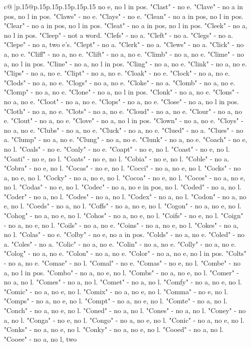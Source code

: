 \documentclass{article}
\begin{document}
{\begin{supertabular}{c@{$\;$}|p{.15\linewidth}@{}p{.15\linewidth}p{.15\linewidth}p{.15\linewidth}p{.15\linewidth}p{.15\linewidth}}
{{{no e, no l in pos. "Clast" {-} no e. "Clave" {-} no a in pos, no l in pos. "Claws" {-} no e. "Clays" {-} no e. "Clean" {-} no a in pos, no l in pos. "Clear" {-} no a in pos, no l in pos. "Cleat" {-} no a in pos, no l in pos. "Cleek" {-} no a, no l in pos. "Cleep" {-} not a word. "Clefs" {-} no a. "Cleft" {-} no a. "Clegs" {-} no a. "Clepe" {-} no a, two e's. "Clept" {-} no a. "Clerk" {-} no a. "Clews" {-} no a. "Click" {-} no a, no e. "Cliff" {-} no a, no e. "Clift" {-} no a, no e. "Climb" {-} no a, no e. "Clime" {-} no a, no l in pos. "Cline" {-} no a, no l in pos. "Cling" {-} no a, no e. "Clink" {-} no a, no e. "Clips" {-} no a, no e. "Clipt" {-} no a, no e. "Cloak" {-} no e. "Clock" {-} no a, no e. "Clods" {-} no a, no e. "Clogs" {-} no a, no e. "Cloke" {-} no a. "Clomb" {-} no a, no e. "Clomp" {-} no a, no e. "Clone" {-} no a, no l in pos. "Clonk" {-} no a, no e. "Clons" {-} no a, no e. "Cloot" {-} no a, no e. "Clops" {-} no a, no e. "Close" {-} no a, no l in pos. "Cloth" {-} no a, no e. "Clots" {-} no a, no e. "Cloud" {-} no a, no e. "Clour" {-} no a, no e. "Clout" {-} no a, no e. "Clove" {-} no a, no l in pos. "Clown" {-} no a, no e. "Cloys" {-} no a, no e. "Clubs" {-} no a, no e. "Cluck" {-} no a, no e. "Clued" {-} no a. "Clues" {-} no a. "Clump" {-} no a, no e. "Clung" {-} no a, no e. "Clunk" {-} no a, no e. "Coach" {-} no e, no l. "Coals" {-} no e. "Coaly" {-} no e. "Coapt" {-} no e, no l. "Coast" {-} no e, no l. "Coati" {-} no e, no l. "Coats" {-} no e, no l. "Cobia" {-} no e, no l. "Coble" {-} no a. "Cobra" {-} no e, no l. "Cocas" {-} no e, no l. "Cocci" {-} no a, no e, no l. "Cocks" {-} no a, no e, no l. "Cocky" {-} no a, no e, no l. "Cocoa" {-} no e, no l. "Cocos" {-} no a, no e, no l. "Codas" {-} no e, no l. "Codec" {-} no a, no e in pos, no l. "Coded" {-} no a, no l. "Coder" {-} no a, no l. "Codes" {-} no a, no l. "Codex" {-} no a, no l. "Codon" {-} no a, no e, no l. "Coeds" {-} no a, no l. "Coffs" {-} no a, no e, no l. "Cogon" {-} no a, no e, no l. "Cohog" {-} no a, no e, no l. "Cohos" {-} no a, no e, no l. "Coifs" {-} no e, no l. "Coign" {-} no a, no e, no l. "Coils" {-} no a, no e. "Coins" {-} no a, no e, no l. "Cokes" {-} no a, no l. "Colas" {-} no e. "Colby" {-} no e, no a in pos. "Colds" {-} no a, no e. "Coled" {-} no a. "Coles" {-} no a. "Colic" {-} no a, no e. "Colin" {-} no a, no e. "Colly" {-} no a, no e. "Colog" {-} no a, no e. "Colon" {-} no a, no e. "Color" {-} no a, no e, no l in pos. "Colts" {-} no a, no e. "Comae" {-} no l. "Comal" {-} no e. "Comas" {-} no e, no l. "Combe" {-} no a, no l in pos. "Combo" {-} no a, no e, no l. "Combs" {-} no a, no e, no l. "Comer" {-} no a, no l. "Comes" {-} no a, no l. "Comet" {-} no a, no l. "Comfy" {-} no a, no e, no l. "Comic" {-} no a, no e, no l. "Comix" {-} no a, no e, no l. "Comma" {-} no e, no l. "Comps" {-} no a, no e, no l. "Compt" {-} no a, no e, no l. "Comte" {-} no a, no l. "Conch" {-} no a, no e, no l. "Coned" {-} no a, no l. "Cones" {-} no a, no l. "Coney" {-} no a, no l. "Conga" {-} no e, no l. "Congo" {-} no a, no e, no l. "Conic" {-} no a, no e, no l. "Conks" {-} no a, no e, no l. "Conky" {-} no a, no e, no l. "Cooed" {-} no a, no l. "Cooee" {-} no a, no l, two }}}
\end{supertabular}}
\end{document}
